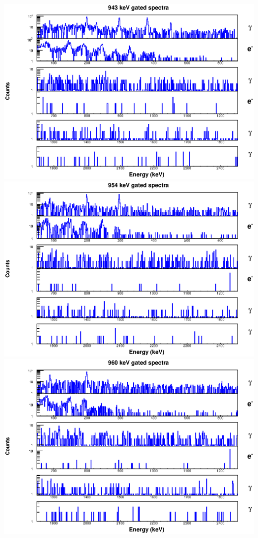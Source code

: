 \begin{landscape}
\includegraphics[scale=1.1]{156Gd_Appendix/943_combined.eps}
\includegraphics[scale=1.1]{156Gd_Appendix/954_combined.eps}
\includegraphics[scale=1.1]{156Gd_Appendix/960_combined.eps}

\end{landscape}
